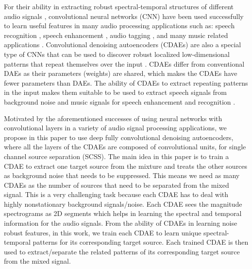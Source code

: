 \documentclass{article}
\begin{document}
For their ability in extracting robust spectral-temporal structures of different audio signals \cite{Honglak:09:uflaccdbn}, convolutional neural networks (CNN) have been used successfully to learn useful features in many audio processing applications such as: speech recognition \cite{Yanmin:16:vdcnnnrsr}, speech enhancement \cite{Szu:16:snrcnnmse}, audio tagging \cite{Yong:17:cgrnnisfat}, and many music related applications \cite{Yoonchang:17:dcnnpirpm,Keunwoo:16:crnnmc,Filip:16:fcdammcr}. Convolutional denoising autoencoders (CDAEs) are also a special type of CNNs that can be used to discover robust localized low-dimensional patterns that repeat themselves over the input \cite{Jonathan:11:scaehfe,Bo:17:scdaefr}. CDAEs differ from conventional DAEs as their parameters (weights) are shared, which makes the CDAEs have fewer parameters than DAEs. The ability of CDAEs to extract repeating patterns in the input makes them suitable to be used to extract speech signals from background noise and music signals for speech enhancement and recognition \cite{se:16:fcnnse,Mengyuan:16:mrcdasr}. 

Motivated by the aforementioned successes of using neural networks with convolutional layers in a variety of audio signal processing applications, we propose in this paper to use deep fully convolutional denoising autoencoders, where all the layers of the CDAEs are composed of convolutional units, for single channel source separation (SCSS). The main idea in this paper is to train a CDAE to extract one target source from the mixture and treats the other sources as background noise that needs to be suppressed. This means we need as many CDAEs as the number of sources that need to be separated from the mixed signal. This is a very challenging task because each CDAE has to deal with highly nonstationary background signals/noise. Each CDAE sees the magnitude spectrograms as 2D segments which helps in learning the spectral and temporal information for the audio signals. From the ability of CDAEs in learning noise robust features, in this work, we train each CDAE to learn unique spectral-temporal patterns for its corresponding target source. Each trained CDAE is then used to extract/separate the related patterns of its corresponding target source from the mixed signal.
\end{document}
